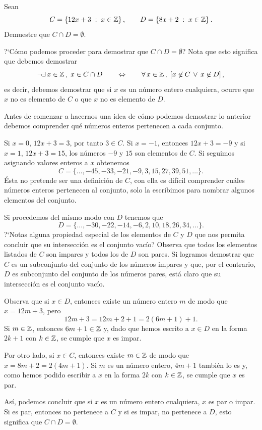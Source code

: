 \begin{ejemplo}\leavevmode
	Sean
	\[
	C = \left\{12x+3\;:\;x \in \mathbb{Z}\right\},\qquad 
	D = \left\{8x+2\;:\; x \in \mathbb{Z}\right\}.
	\]
	Demuestre que $C \cap D = \emptyset$.
	
	?`C\'omo podemos proceder para demostrar que $C \cap D = \emptyset$? 
	Nota que esto significa que debemos demostrar
	\[	
    \neg\exists\,x\in \mathbb{Z}\, ,\;x \in C\cap D\qquad
		\Leftrightarrow \qquad
		\forall\,x \in \mathbb{Z} \, ,\; \left[x\not \in C\,\vee \, x \not \in D\right],
	\]
	es decir, debemos demostrar que si $x$ es un n\'umero entero cualquiera,
	ocurre que $x$ no es elemento de $C$ o que $x$ no es elemento de $D$.
		
	Antes de comenzar a hacernos una idea de c\'omo podemos demostrar
	lo anterior debemos
	comprender qu\'e n\'umeros enteros pertenecen a cada conjunto.
	
	Si $x=0$, $12x+3 = 3$, por tanto $3 \in C$.
	Si $x=-1$, entonces $12x+3 = -9$ y si $x=1$, $12x+3 = 15$, los
	n\'umeros $-9$ y $15$ son elementos de $C$. Si seguimos asignando
	valores enteros a $x$ obtenemos 
	\[
	C = \{\ldots,-45, -33, -21, -9, 3, 15, 27, 39, 51, \ldots\}.
	\]
	\'Esta no pretende ser una definici\'on de $C$,
	con ella es dif\'icil comprender cu\'ales 
	n\'umeros enteros pertenecen al conjunto, solo la escribimos 
	para nombrar algunos elementos del conjunto.
	
	Si procedemos del mismo modo con $D$ tenemos que 
	\[
	D = \{\ldots,-30,-22,-14,-6,2,10,18,26,34,\ldots\}.		
	\]
	?`Notas alguna propiedad especial de los elementos de $C$ y $D$ que nos
	permita concluir que su intersecci\'on es el conjunto vac\'io?
	Observa que todos los elementos listados de $C$ son impares y todos los de 
	$D$ son pares. Si logramos demostrar que $C$ es un subconjunto del
	conjunto de los n\'umeros impares y que, por el contrario, $D$
	es subconjunto del conjunto de los n\'umeros pares, est\'a claro
	que su intersecci\'on es el conjunto vac\'io.
	
	Observa que si $x \in D$, entonces existe un n\'umero entero
	$m$ de modo que $x = 12m+3$, pero
	\[
	12m + 3 = 12m + 2 + 1 = 2(6m+1) + 1.
	\]
	Si $m\in \mathbb{Z}$, entonces $6m+1 \in \mathbb{Z}$ y, dado que hemos escrito
	a $x \in D$ en la forma $2k+1$ con $k\in \mathbb{Z}$, se cumple que 
	$x$ es impar.
	
	Por otro lado, si $x \in C$, entonces existe $m \in \mathbb{Z}$ de modo que
	$x = 8m + 2 = 2(4m+1)$. Si $m$ es un n\'umero entero,
	$4m+1$ tambi\'en lo es y, como hemos podido escribir a $x$ en la
	forma $2k$ con $k\in \mathbb{Z}$, se cumple que $x$ es par.
	
	As\'i, podemos concluir que si $x$ es un n\'umero entero cualquiera,
	$x$ es par o impar. Si es par, entonces no pertenece a $C$ y si es impar,
	no pertenece a $D$, esto significa que $C \cap D = \emptyset$.
\end{ejemplo}

